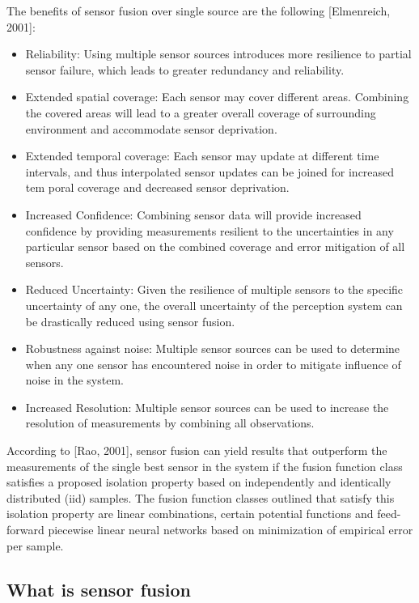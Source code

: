 The beneﬁts of sensor fusion over single source are
the following [Elmenreich, 2001]:
\begin{itemize}
 \item Reliability: Using multiple sensor sources introduces more resilience to partial sensor failure, which leads to greater redundancy and reliability.
 \item Extended spatial coverage: Each sensor may cover diﬀerent areas. Combining the covered areas will lead to a greater overall coverage of surrounding
environment and accommodate sensor deprivation.
 \item Extended temporal coverage: Each sensor may update at diﬀerent time intervals, and thus interpolated sensor updates can be joined for increased tem
poral coverage and decreased sensor deprivation.
 \item Increased Conﬁdence: Combining sensor data will provide increased conﬁdence by providing measurements resilient to the uncertainties in any particular
sensor based on the combined coverage and error mitigation of all sensors. \item  Reduced Uncertainty: Given the resilience of multiple sensors to the speciﬁc uncertainty of any one, the overall uncertainty of the perception system can be
drastically reduced using sensor fusion.
 \item Robustness against noise: Multiple sensor sources can be used to determine when any one sensor has encountered noise in order to mitigate inﬂuence of
noise in the system.
 \item Increased Resolution: Multiple sensor sources can be used to increase the resolution of measurements by combining all observations.
\end{itemize}
According to [Rao, 2001], sensor fusion can yield results that outperform the measurements of the single best sensor in the system if the fusion function class satisﬁes a
proposed isolation property based on independently and identically distributed (iid)
samples. The fusion function classes outlined that satisfy this isolation property
are linear combinations, certain potential functions and feed-forward piecewise linear
neural networks based on minimization of empirical error per sample.

\subsection{What is sensor fusion}




